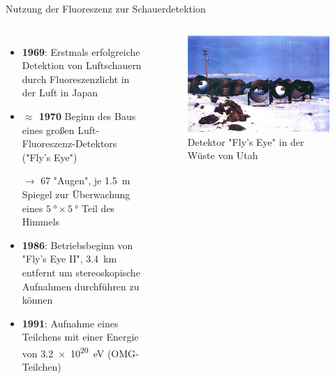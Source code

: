 \documentclass[aspectratio=1610, professionalfonts, 9pt, hyperref={colorlinks=false}]{beamer}
\begin{document}
\begin{frame}{Nutzung der Fluoreszenz zur Schauerdetektion}
  \begin{columns}
      \begin{itemize}
        \setlength\itemsep{0.5em}
        \item \textbf{1969}: Erstmals erfolgreiche Detektion von Luftschauern durch Fluoreszenzlicht in der Luft in Japan
        \item \textbf{$\approx$ 1970} Beginn des Baus eines großen Luft-Fluoreszenz-Detektors ("Fly's Eye")
        \item[$\rightarrow$] 67 "Augen", je \SI{1.5}{\meter} Spiegel zur Überwachung eines $\SI{5}{\degree} \times \SI{5}{\degree}$ Teil des Himmels
        \item \textbf{1986}: Betriebsbeginn von "Fly's Eye II", \SI{3.4}{\kilo\metre} entfernt um stereoskopische Aufnahmen durchführen zu können
        \item \textbf{1991}: Aufnahme eines Teilchens mit einer Energie von \SI{3.2e20}{\electronvolt} (OMG-Teilchen)
      \end{itemize}
        \vspace*{10px}
  
      \begin{figure}
          \centering
          \includegraphics[width=\linewidth]{images/FlysEye.jpg}
          \caption{Detektor "Fly's Eye" in der Wüste von Utah \cite{flyeye}}
      \end{figure}
  \end{columns}
\end{frame}
\end{document}
